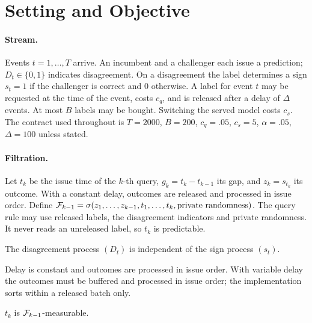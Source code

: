 \section{Setting and Objective}\label{sec:setting}

\paragraph{Stream.} Events $t=1,\dots,T$ arrive. An incumbent and a challenger each issue a
prediction; $D_t\in\{0,1\}$ indicates disagreement. On a disagreement the label determines a sign
$s_t=1$ if the challenger is correct and $0$ otherwise. A label for event $t$ may be requested at the
time of the event, costs $c_q$, and is released after a delay of $\Delta$ events. At most $B$ labels
may be bought. Switching the served model costs $c_s$. The contract used throughout is
$T=2000$, $B=200$, $c_q=.05$, $c_s=5$, $\alpha=.05$, $\Delta=100$ unless stated.

\paragraph{Filtration.} Let $t_k$ be the issue time of the $k$-th query, $g_k=t_k-t_{k-1}$ its gap,
and $z_k=s_{t_k}$ its outcome. With a constant delay, outcomes are released and processed in issue
order. Define
$\mathcal{F}_{k-1}=\sigma(z_1,\dots,z_{k-1},t_1,\dots,t_k,\text{private randomness})$.
The query rule may use released labels, the disagreement indicators and private randomness. It never
reads an unreleased label, so $t_k$ is predictable.

\begin{assumption}\label{as:indep}
The disagreement process $(D_t)$ is independent of the sign process $(s_t)$.
\end{assumption}
\begin{assumption}\label{as:delay}
Delay is constant and outcomes are processed in issue order. With variable delay the outcomes must be
buffered and processed in issue order; the implementation sorts within a released batch only.
\end{assumption}
\begin{assumption}\label{as:pred}
$t_k$ is $\mathcal{F}_{k-1}$-measurable.
\end{assumption}


